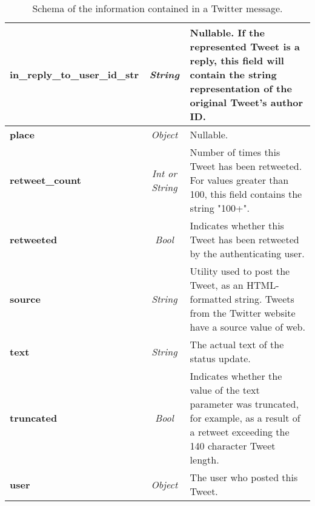 \begin{table}
\begin{tabular}{|l|c|p{9cm}|}
\bf in\_reply\_to\_user\_id\_str	&	\it String			&	Nullable. If the represented Tweet is a reply, this field will contain the string representation of the original Tweet's author ID. \\ \hline
\bf place							&	\it Object			& 	Nullable. \\ \hline
\bf retweet\_count					&	\it Int or String	& 	Number of times this Tweet has been retweeted. For values greater than 100, this field contains the string "100+". \\ \hline
\bf retweeted						&	\it Bool	 		& 	Indicates whether this Tweet has been retweeted by the authenticating user. \\ \hline
\bf source							&	\it String			&  	Utility used to post the Tweet, as an HTML-formatted string. Tweets from the Twitter website have a source value of web.\\ \hline
\bf text							&	\it String			& 	The actual text of the status update.\\ \hline
\bf truncated						&	\it Bool			& 	Indicates whether the value of the text parameter was truncated, for example, as a result of a retweet exceeding the 140 character Tweet length. \\ \hline
\bf user							&	\it Object	 		& 	The user who posted this Tweet. \\ \hline

\end{tabular}
\caption{Schema of the information contained in a Twitter message.}
\label{tab:tweet}
\end{table}

